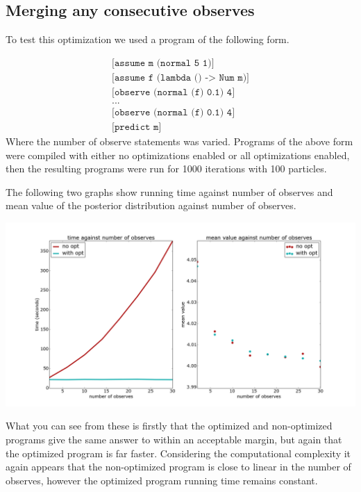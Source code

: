 \documentclass[a4paper]{article}
\begin{document}

\subsection{Merging any consecutive observes}

To test this optimization we used a program of the following form.

\[
	\begin{array}{l}
		\texttt{[assume m (normal 5 1)]} \\
		\texttt{[assume f (lambda () -> Num m)]} \\
		\texttt{[observe (normal (f) 0.1) 4]} \\
		\texttt{...} \\
		\texttt{[observe (normal (f) 0.1) 4]} \\
		\texttt{[predict m]}
	\end{array}
\]
Where the number of observe statements was varied. Programs of the above form were compiled with either no optimizations enabled or all optimizations enabled, then the resulting programs were run for 1000 iterations with 100 particles.

The following two graphs show running time against number of observes and mean value of the posterior distribution against number of observes.

\centerline{\includegraphics[width=16cm]{images/merging_consecutive_observes_1.png}}

What you can see from these is firstly that the optimized and non-optimized programs give the same answer to within an acceptable margin, but again that the optimized program is far faster. Considering the computational complexity it again appears that the non-optimized program is close to linear in the number of observes, however the optimized program running time remains constant.
\end{document}
